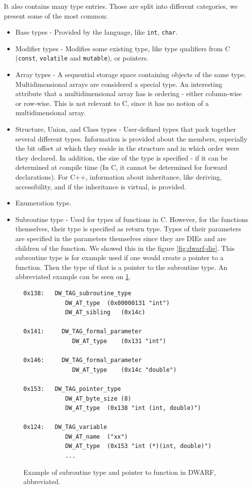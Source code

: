It also contains many type entries.
Those are split into different categories, we present some of the most common:
\begin{itemize}
    \item Base types - Provided by the language, like \texttt{int},
        \texttt{char}.
    \item Modifier types - Modifies some existing type, like type qualifiers
        from C (\texttt{const}, \texttt{volatile} and \texttt{mutable}), or
        pointers.
    \item Array types - A sequential storage space containing objects of the
        same type. Multidimensional arrays are considered a special type.
        An interesting attribute that a multidimensional array has is ordering -
        either column-wise or row-wise. This is not relevant to C, since it has no
        notion of a multidimensional array.
    \item Structure, Union, and Class types - User-defined types that pack
        together several different types. Information is provided about the
        members, especially the bit offset at which they reside in the structure
        and in which order were they declared. In addition, the size of the type
        is specified - if it can be determined at compile time (In C, it cannot
        be determined for forward declarations). For C++, information about
        inheritance, like deriving, accessibility, and if the inheritance is
        virtual, is provided.
    \item Enumeration type.
    \item Subroutine type - Used for types of functions in C. However, for the
        functions themselves, their type is specified as return type. Types of
        their parameters are specified in the parameters themselves since they
        are DIEs and are children of the function. We showed this in the figure
        \ref{fig:dwarf-die}. This subroutine type is for example used if one
        would create a pointer to a function. Then the type of that is a pointer
        to the subroutine type. An abbreviated example can be seen on
        \ref{fig:dwarf-ptr-to-fun}.
\end{itemize}

\begin{figure}
    \begin{lstlisting}
0x138:   DW_TAG_subroutine_type
            DW_AT_type	(0x00000131 "int")
            DW_AT_sibling	(0x14c)

0x141:     DW_TAG_formal_parameter
              DW_AT_type	(0x131 "int")

0x146:     DW_TAG_formal_parameter
              DW_AT_type	(0x14c "double")

0x153:   DW_TAG_pointer_type
            DW_AT_byte_size	(8)
            DW_AT_type	(0x138 "int (int, double)")

0x124:   DW_TAG_variable
            DW_AT_name	("xx")
            DW_AT_type	(0x153 "int (*)(int, double)")
            ...
    \end{lstlisting}
    \label{fig:dwarf-ptr-to-fun}
    \caption{Example of subroutine type and pointer to function in DWARF, abbreviated.}
\end{figure}

